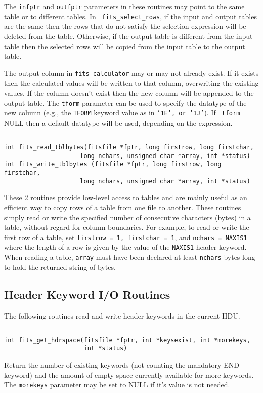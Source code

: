 \documentclass[11pt]{article}
\begin{document}
The {\tt infptr} and {\tt outfptr} parameters in these routines may
point to the same table or to different tables.  In {\tt
fits\_select\_rows}, if the input and output tables are the same then
the rows that do not satisfy the selection expression will be deleted
from the table.  Otherwise, if the output table is different from the
input table then the selected rows will be copied from the input table
to the output table.

The output column in {\tt fits\_calculator} may or may not already
exist.  If it exists then the calculated values will be written to that
column, overwriting the existing values.  If the column doesn't exist
then the new column will be appended to the output table. The {\tt tform}
parameter can be used to specify the datatype of the new column (e.g.,
the {\tt TFORM} keyword value as in {\tt '1E', or '1J'}). If {\tt
tform} = NULL then a default datatype will be used, depending on the
expression.

\begin{verbatim}
_____________________________________________________________________
int fits_read_tblbytes(fitsfile *fptr, long firstrow, long firstchar,
                     long nchars, unsigned char *array, int *status)
int fits_write_tblbytes (fitsfile *fptr, long firstrow, long firstchar,
                     long nchars, unsigned char *array, int *status)
\end{verbatim}

These 2 routines provide low-level access to tables and are mainly
useful as an efficient way to copy rows of a table from one file to
another.  These routines simply read or write the specified number of
consecutive characters (bytes) in a table, without regard for column
boundaries.  For example, to read or write the first row of a table,
set {\tt firstrow = 1, firstchar = 1}, and {\tt nchars = NAXIS1} where
the length of a row is given by the value of the {\tt NAXIS1} header
keyword.  When reading a table, {\tt array} must have been declared at
least {\tt nchars} bytes long to hold the returned string of bytes.

\newpage
\subsection{Header Keyword I/O Routines}
\nopagebreak
The following routines read and write header keywords in the current HDU.
\nopagebreak

\begin{verbatim}
____________________________________________________________________
int fits_get_hdrspace(fitsfile *fptr, int *keysexist, int *morekeys,
                      int *status)
\end{verbatim}
\nopagebreak
Return the number of existing keywords (not counting the mandatory END
keyword) and the amount of empty space currently available for more
keywords. The {\tt morekeys} parameter may be set to NULL if it's value is
not needed.
\end{document}
